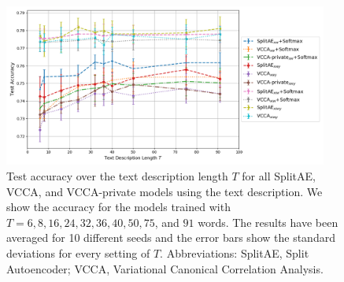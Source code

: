 
\begin{figure}[t]
    \centering
    \includegraphics[width=0.95\textwidth]{PaperB/figures_and_tables/varying_t_NEW2.png}
    \caption{Test accuracy over the text description length $T$ for all SplitAE, VCCA, and VCCA-private models using the text description. We show the accuracy for the models trained with $T = 6, 8, 16, 24, 32, 36, 40, 50, 75$, and $91$ words. The results have been averaged for 10 different seeds and the error bars show the standard deviations for every setting of $T$. Abbreviations: SplitAE, Split Autoencoder; VCCA, Variational Canonical Correlation Analysis.}
    \label{fig:varying_t}
\end{figure}